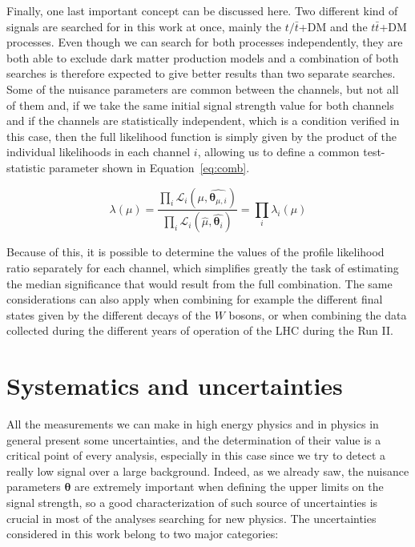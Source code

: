 \documentclass[a4paper, 10pt, openright]{report}
\begin{document}
Finally, one last important concept can be discussed here. Two different kind of signals are searched for in this work at once, mainly the $t/\bar t$+DM and the $t \bar t$+DM processes. Even though we can search for both processes independently, they are both able to exclude dark matter production models and a combination of both searches is therefore expected to give better results than two separate searches. Some of the nuisance parameters are common between the channels, but not all of them and, if we take the same initial signal strength value for both channels and if the channels are statistically independent, which is a condition verified in this case, then the full likelihood function is simply given by the product of the individual likelihoods in each channel $i$, allowing us to define a common test-statistic parameter shown in Equation~\ref{eq:comb}.

\begin{equation}
\label{eq:comb}
\lambda (\mu) = \frac{\prod_i \mathcal{L}_i(\mu, \hat{\bm \theta_{\mu, i}})}{\prod_i \mathcal{L}_i (\hat{\mu}, \hat{\bm \theta_i})} = \prod_i \lambda_i (\mu)
\end{equation}

Because of this, it is possible to determine the values of the profile likelihood ratio separately for each channel, which simplifies greatly the task of estimating the median significance that would result from the full combination. The same considerations can also apply when combining for example the different final states given by the different decays of the $W$ bosons, or when combining the data collected during the different years of operation of the \ac{LHC} during the Run II.

\section{Systematics and uncertainties} \label{section:Systematics}

All the measurements we can make in high energy physics and in physics in general present some
uncertainties, and the determination of their value is a critical point of every analysis, especially in this case since we try to detect a really low signal over a large background. Indeed, as we already saw, the nuisance parameters $\bm \theta$ are extremely important when defining the upper limits on the signal strength, so a good characterization of such source of uncertainties is crucial in most of the analyses searching for new physics. The uncertainties considered in this work belong to two major categories:
\end{document}
